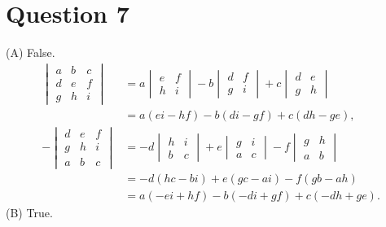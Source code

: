 \documentclass{article}
\begin{document}
\section*{Question 7}
(A) False.
\begin{align*}
\begin{vmatrix} 
a & b & c \\ 
d & e & f \\ 
g & h & i
\end{vmatrix} 
&= a \begin{vmatrix} e & f \\ h & i \end{vmatrix} 
- b \begin{vmatrix} d & f \\ g & i \end{vmatrix}  
+ c \begin{vmatrix} d & e \\ g & h \end{vmatrix}  \\
&= a(ei - hf) - b(di -gf) + c(dh -ge), \\
-\begin{vmatrix} d
& e & f \\ 
g & h & i \\ a
& b & c
\end{vmatrix}
&= - d \begin{vmatrix} h & i \\ b & c \end{vmatrix} 
+ e\begin{vmatrix} g & i \\ a & c \end{vmatrix} 
- f\begin{vmatrix} g & h \\ a & b \end{vmatrix}  \\ 
&= -d (hc - bi) + e(gc - ai) - f(gb - ah) \\ 
&= a (-ei + hf) - b (-di + gf) + c (-dh + ge).
\end{align*}
(B) True.
\end{document}
